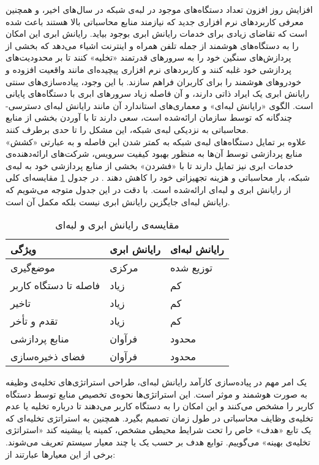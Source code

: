 افزایش روز افزون تعداد دستگاه‌های موجود در لبه‌ی شبکه در سال‌های اخیر، و همچنین معرفی کاربردهای نرم افزاری جدید که نیازمند منابع محاسباتی بالا هستند باعث شده است که تقاضای زیادی برای خدمات رایانش ابری بوجود بیاید. رایانش ابری این امکان را به دستگاه‌های هوشمند از جمله تلفن همراه و اینترنت اشیاء می‌دهد که بخشی از پردازش‌های سنگین خود را به سرورهای قدرتمند «تخلیه» کنند تا بر محدودیت‌های پردازشی خود غلبه کنند و کاربردهای نرم افزاری پیچیده‌ای مانند واقعیت افزوده و خودروهای هوشمند را برای کاربران فراهم سازند. با این وجود، پیاده‌سازی‌های سنتی رایانش ابری یک ایراد ذاتی دارند، و آن فاصله زیاد سرورهای ابری با دستگاه‌های پایانی است. الگوی «رایانش لبه‌ای» و معماری‌های استاندارد آن مانند رایانش لبه‌ای دسترسی-چندگانه که توسط سازمان  ارائه‌شده است، سعی دارند تا با آوردن بخشی از منابع محاسباتی به نزدیکی لبه‌ی شبکه، این مشکل را تا حدی برطرف کنند.
\cite{guggulothu2019codesmelldetectionusing}
\\
علاوه بر تمایل دستگاه‌های لبه‌ی شبکه به کمتر شدن این فاصله و به عبارتی «کشش» منابع پردازشی توسط آن‌ها به منظور بهبود کیفیت سرویس، شرکت‌های ارائه‌دهنده‌ی خدمات ابری نیز تمایل دارند تا با «فشردن» بخشی از منابع پردازشی خود به لبه‌ی شبکه، بار محاسباتی و هزینه تجهیزاتی خود را کاهش دهند \Cite{edgevisions}. در جدول \ref{table:compare} مقایسه‌ای کلی از رایانش ابری و لبه‌ای ارائه‌شده است. با دقت در این جدول متوجه می‌شویم که رایانش لبه‌ای جایگزین رایانش ابری نیست بلکه مکمل آن است.\cite{das2019detecting}
\newpage
\begin{table}[H]
	\centering
	\begin{tabular}{@{}lll@{}}
		\toprule
		ویژگی                 & رایانش ابری & رایانش لبه‌ای \\ \midrule
		موضع‌گیری              & مرکزی       & توزیع شده    \\
		فاصله تا دستگاه کاربر & زیاد        & کم           \\
		تاخیر                 & زیاد        & کم           \\
		تقدم و تأخر           & زیاد        & کم           \\
		منابع پردازشی         & فرآوان      & محدود        \\
		فضای ذخیره‌سازی        & فرآوان      & محدود        \\ \bottomrule
	\end{tabular}
	\caption{مقایسه‌ی رایانش ابری و لبه‌ای}
	\label{table:compare}
\end{table}
یک امر مهم در پیاده‌سازی کارآمد رایانش لبه‌ای، طراحی استراتژی‌های تخلیه‌ی وظیفه به صورت هوشمند و موثر است. این استراتژی‌ها نحوه‌ی تخصیص منابع توسط دستگاه کاربر را مشخص می‌کنند و این امکان را به دستگاه کاربر می‌دهند تا درباره تخلیه یا عدم تخلیه‌ی وظایف محاسباتی در طول زمان تصمیم بگیرد. همچنین به استراتژی تخلیه‌ای که یک تابع «هدف» خاص را تحت شرایط محیطی مشخص، کمینه یا بیشینه کند «استراتژی تخلیه‌ی بهینه» می‌گوییم. توابع هدف بر حسب یک یا چند معیار سیستم تعریف می‌شوند. برخی از این معیارها عبارتند از:
